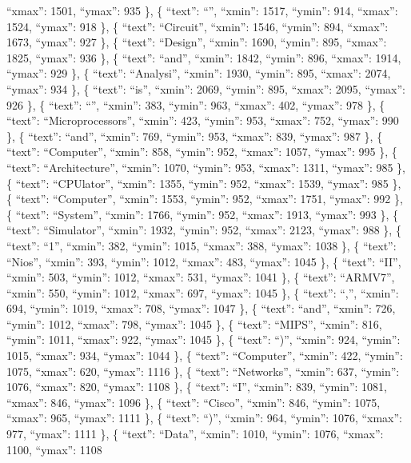 \documentclass[
]{article}
\begin{document}
``xmax'': 1501, ``ymax'': 935 \}, \{ ``text'': ``\textbar{}'', ``xmin'':
1517, ``ymin'': 914, ``xmax'': 1524, ``ymax'': 918 \}, \{ ``text'':
``Circuit'', ``xmin'': 1546, ``ymin'': 894, ``xmax'': 1673, ``ymax'':
927 \}, \{ ``text'': ``Design'', ``xmin'': 1690, ``ymin'': 895,
``xmax'': 1825, ``ymax'': 936 \}, \{ ``text'': ``and'', ``xmin'': 1842,
``ymin'': 896, ``xmax'': 1914, ``ymax'': 929 \}, \{ ``text'':
``Analysi'', ``xmin'': 1930, ``ymin'': 895, ``xmax'': 2074, ``ymax'':
934 \}, \{ ``text'': ``is'', ``xmin'': 2069, ``ymin'': 895, ``xmax'':
2095, ``ymax'': 926 \}, \{ ``text'': ``\textbar{}'', ``xmin'': 383,
``ymin'': 963, ``xmax'': 402, ``ymax'': 978 \}, \{ ``text'':
``Microprocessors'', ``xmin'': 423, ``ymin'': 953, ``xmax'': 752,
``ymax'': 990 \}, \{ ``text'': ``and'', ``xmin'': 769, ``ymin'': 953,
``xmax'': 839, ``ymax'': 987 \}, \{ ``text'': ``Computer'', ``xmin'':
858, ``ymin'': 952, ``xmax'': 1057, ``ymax'': 995 \}, \{ ``text'':
``Architecture'', ``xmin'': 1070, ``ymin'': 953, ``xmax'': 1311,
``ymax'': 985 \}, \{ ``text'': ``CPUlator'', ``xmin'': 1355, ``ymin'':
952, ``xmax'': 1539, ``ymax'': 985 \}, \{ ``text'': ``Computer'',
``xmin'': 1553, ``ymin'': 952, ``xmax'': 1751, ``ymax'': 992 \}, \{
``text'': ``System'', ``xmin'': 1766, ``ymin'': 952, ``xmax'': 1913,
``ymax'': 993 \}, \{ ``text'': ``Simulator'', ``xmin'': 1932, ``ymin'':
952, ``xmax'': 2123, ``ymax'': 988 \}, \{ ``text'': ``1'', ``xmin'':
382, ``ymin'': 1015, ``xmax'': 388, ``ymax'': 1038 \}, \{ ``text'':
``Nios'', ``xmin'': 393, ``ymin'': 1012, ``xmax'': 483, ``ymax'': 1045
\}, \{ ``text'': ``II'', ``xmin'': 503, ``ymin'': 1012, ``xmax'': 531,
``ymax'': 1041 \}, \{ ``text'': ``ARMV7'', ``xmin'': 550, ``ymin'':
1012, ``xmax'': 697, ``ymax'': 1045 \}, \{ ``text'': ``,'', ``xmin'':
694, ``ymin'': 1019, ``xmax'': 708, ``ymax'': 1047 \}, \{ ``text'':
``and'', ``xmin'': 726, ``ymin'': 1012, ``xmax'': 798, ``ymax'': 1045
\}, \{ ``text'': ``MIPS'', ``xmin'': 816, ``ymin'': 1011, ``xmax'': 922,
``ymax'': 1045 \}, \{ ``text'': ``)'', ``xmin'': 924, ``ymin'': 1015,
``xmax'': 934, ``ymax'': 1044 \}, \{ ``text'': ``Computer'', ``xmin'':
422, ``ymin'': 1075, ``xmax'': 620, ``ymax'': 1116 \}, \{ ``text'':
``Networks'', ``xmin'': 637, ``ymin'': 1076, ``xmax'': 820, ``ymax'':
1108 \}, \{ ``text'': ``I'', ``xmin'': 839, ``ymin'': 1081, ``xmax'':
846, ``ymax'': 1096 \}, \{ ``text'': ``Cisco'', ``xmin'': 846, ``ymin'':
1075, ``xmax'': 965, ``ymax'': 1111 \}, \{ ``text'': ``)'', ``xmin'':
964, ``ymin'': 1076, ``xmax'': 977, ``ymax'': 1111 \}, \{ ``text'':
``Data'', ``xmin'': 1010, ``ymin'': 1076, ``xmax'': 1100, ``ymax'': 1108
\end{document}
